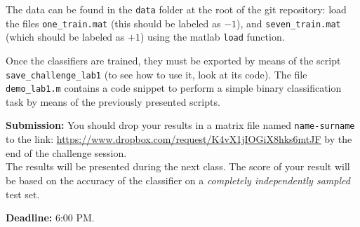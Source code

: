 \documentclass[DIN, pagenumber=false, fontsize=11pt, parskip=half]{scrartcl}
\begin{document}
The data can be found in the \texttt{data} folder at the root of the git repository: load the files \texttt{one\_train.mat} (this should be labeled as $-1$), and \texttt{seven\_train.mat} (which should be labeled as $+1$) using the matlab \texttt{load} function.

Once the classifiers are trained, they must be exported by means of the script \texttt{save\_challenge\_lab1}   (to see how to use it, look at its code). The file \texttt{demo\_lab1.m} contains a code snippet to perform a simple binary classification task by means of the previously presented scripts.

\begin{framed}
\textbf{Submission:}
You should drop your results in a matrix file named \texttt{name-surname} to the link: \url{https://www.dropbox.com/request/K4vX1jIOGiX8hks6mtJF} by the end of the challenge session.\\
The results will be presented during the next class. The score of your result will be based on the accuracy of the classifier on a \textit{completely independently sampled} test set.

\textbf{Deadline:} 6:00 PM.
\end{framed}
\end{document}
